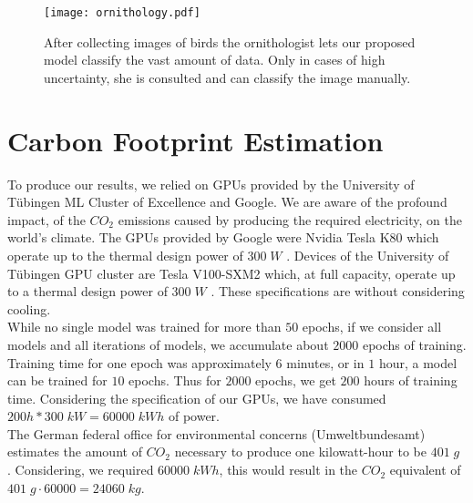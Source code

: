\documentclass[a4paper,cleardoubleempty,BCOR1cm, 11pt]{report}
\begin{document}
\begin{figure}[h]
	\centering
	\texttt{[image: ornithology.pdf]}
	\caption{After collecting images of birds the ornithologist lets our proposed model classify the vast amount of data. Only in cases of high uncertainty, she is consulted and can classify the image manually.}
	\label{fig:qual}
\end{figure}

\section{Carbon Footprint Estimation}
To produce our results, we relied on GPUs provided by the University of Tübingen ML Cluster of Excellence and Google. We are aware of the profound impact, of the $CO_2$ emissions caused by producing the required electricity, on the world's climate.
The GPUs provided by Google were Nvidia Tesla K80 which operate up to the thermal design power of $300\;W$ \cite{nvidia2015tesla}. Devices of the University of Tübingen GPU cluster are Tesla V100-SXM2 which, at full capacity, operate up to a thermal design power of $300\;W$ \cite{nvidia2017tesla}. These specifications are without considering cooling.\\
While no single model was trained for more than $50$ epochs, if we consider all models and all iterations of models, we accumulate about $2000$ epochs of training. Training time for one epoch was approximately $6$ minutes, or in $1$ hour, a model can be trained for $10$ epochs. Thus for $2000$ epochs, we get $200$ hours of training time. Considering the specification of our GPUs, we have consumed $200h * 300\;kW = 60000\;kWh$ of power.\\
The German federal office for environmental concerns (Umweltbundesamt) estimates the amount of $CO_2$ necessary to produce one kilowatt-hour to be $401\;g$ \cite{icha2016entwicklung}. Considering, we required $60000\;kWh$, this would result in the $CO_2$ equivalent of $401\;g \cdot 60000 = 24060\;kg$.
\end{document}
